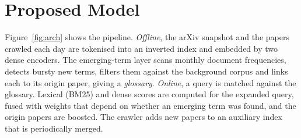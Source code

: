 \documentclass[10pt,twocolumn]{article}
\begin{document}
\section{Proposed Model}
Figure~\ref{fig:arch} shows the pipeline. \emph{Offline}, the arXiv snapshot and
the papers crawled each day are tokenised into an inverted index and embedded by
two dense encoders. The emerging-term layer scans monthly document frequencies,
detects bursty new terms, filters them against the background corpus and links each
to its origin paper, giving a \emph{glossary}. \emph{Online}, a query is matched
against the glossary. Lexical (BM25) and dense scores are computed for the expanded
query, fused with weights that depend on whether an emerging term was found, and
the origin papers are boosted. The crawler adds new papers to an auxiliary index
that is periodically merged.
\end{document}
